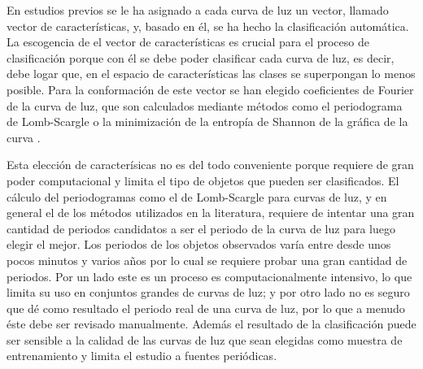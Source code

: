 \documentclass[letterpaper,12pt]{book}
\begin{document}
En estudios previos \cite{debosscher_automated_2007, sarro_automated_2009, richards_machine-learned_2011} se le ha asignado a cada curva de luz un vector, llamado vector de características, y, basado en él, se ha hecho la clasificación automática. La escogencia de el vector de características es crucial para el proceso de clasificación porque con él se debe poder clasificar cada curva de luz, es decir, debe logar que, en el espacio de características las clases se superpongan lo menos posible. Para la conformación de este vector se han elegido coeficientes de Fourier de la curva de luz\cite{debosscher_automated_2007, sarro_automated_2009, richards_machine-learned_2011}, que son calculados mediante métodos como el periodograma de  Lomb-Scargle \cite{scargle_studies_1982} o la minimización de la entropía de Shannon de la gráfica de la curva \cite{cincotta_astronomical_1995}. 

Esta elección de caracterísicas no es del todo conveniente porque requiere de gran poder computacional y limita el tipo de objetos que pueden ser clasificados. El cálculo del periodogramas como el de Lomb-Scargle para curvas de luz, y en general el de los métodos utilizados en la literatura, requiere de intentar una gran cantidad de periodos candidatos a ser el periodo de la curva de luz para luego elegir el mejor. Los periodos de los objetos observados varía entre desde unos pocos minutos y varios años por lo cual se requiere probar una gran cantidad de periodos. Por un lado este es un proceso es computacionalmente intensivo, lo que limita su uso en conjuntos grandes de curvas de luz; y por otro lado no es seguro que dé como resultado el periodo real de una curva de luz, por lo que a menudo éste debe ser revisado manualmente. Además el resultado de la clasificación puede ser sensible a la calidad de las curvas de luz que sean elegidas como muestra de entrenamiento \cite{debosscher_automated_2007} y limita el estudio a fuentes periódicas.  
\end{document}
